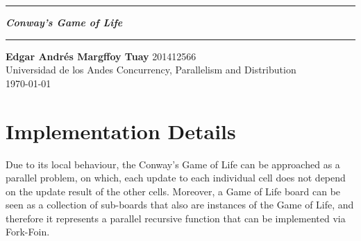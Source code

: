 \documentclass{article}
\newcommand{\squishlist}{
 \begin{list}{$\bullet$}
  { \setlength{\itemsep}{0pt}
     \setlength{\parsep}{3pt}
     \setlength{\topsep}{3pt}
     \setlength{\partopsep}{0pt}
     \setlength{\leftmargin}{1.5em}
     \setlength{\labelwidth}{1em}
     \setlength{\labelsep}{0.5em} } }
\newcommand{\squishend}{
  \end{list}  }
\begin{document}
 \def\maketitle{%
 \thispagestyle{plain}
 \vspace{-10ex}
 \hrule
 \bigskip
 \begin{center}
 {\Large{\textbf{\@title}}}
 \end{center}
 \bigskip
 \hrule

 \bigskip

 \begin{flushleft}
 \textbf{\normalsize{Edgar Andr\'{e}s Margffoy Tuay}} \hfill 201412566
 \\
 \vspace{5pt}
 Universidad de los Andes \hfill Concurrency, Parallelism and Distribution
 \\
 \vspace{5pt}
\hfill \today \\ 
 \end{flushleft}
 }
\def\title#1{\def\@title{#1}}
\title{\textit{Conway's Game of Life}}



\maketitle

\section{Implementation Details}
Due to its local behaviour, the Conway's Game of Life can be approached as a parallel problem, on which, each update to each individual cell does not depend on the update result of the other cells. Moreover, a Game of Life board can be seen as a collection of sub-boards that also are instances of the Game of Life, and therefore it represents a parallel recursive function that can be implemented via Fork-Foin.
\end{document}
